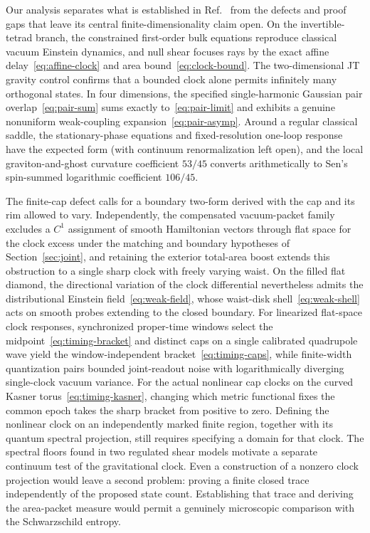 \documentclass[10pt,a4paper]{article}
\numberwithin{equation}{section}
\begin{document}
Our analysis separates what is established in Ref.~\cite{Chandrasekaran2026} from the defects and proof gaps that leave its central finite-dimensionality claim open.
On the invertible-tetrad branch, the constrained first-order bulk equations reproduce classical vacuum Einstein dynamics, and null shear focuses rays by the exact affine delay~\eqref{eq:affine-clock} and area bound~\eqref{eq:clock-bound}.
The two-dimensional JT gravity control confirms that a bounded clock alone permits infinitely many orthogonal states.
In four dimensions, the specified single-harmonic Gaussian pair overlap~\eqref{eq:pair-sum} sums exactly to~\eqref{eq:pair-limit} and exhibits a genuine nonuniform weak-coupling expansion~\eqref{eq:pair-asymp}.
Around a regular classical saddle, the stationary-phase equations and fixed-resolution one-loop response have the expected form (with continuum renormalization left open), and the local graviton-and-ghost curvature coefficient $53/45$ converts arithmetically to Sen's spin-summed logarithmic coefficient $106/45$.

The finite-cap defect calls for a boundary two-form derived with the cap and its rim allowed to vary. Independently, the compensated vacuum-packet family excludes a $C^1$ assignment of smooth Hamiltonian vectors through flat space for the clock excess under the matching and boundary hypotheses of Section~\ref{sec:joint}, and retaining the exterior total-area boost extends this obstruction to a single sharp clock with freely varying waist. On the filled flat diamond, the directional variation of the clock differential nevertheless admits the distributional Einstein field~\eqref{eq:weak-field}, whose waist-disk shell~\eqref{eq:weak-shell} acts on smooth probes extending to the closed boundary. For linearized flat-space clock responses, synchronized proper-time windows select the midpoint~\eqref{eq:timing-bracket} and distinct caps on a single calibrated quadrupole wave yield the window-independent bracket~\eqref{eq:timing-caps}, while finite-width quantization pairs bounded joint-readout noise with logarithmically diverging single-clock vacuum variance. For the actual nonlinear cap clocks on the curved Kasner torus~\eqref{eq:timing-kasner}, changing which metric functional fixes the common epoch takes the sharp bracket from positive to zero. Defining the nonlinear clock on an independently marked finite region, together with its quantum spectral projection, still requires specifying a domain for that clock. The spectral floors found in two regulated shear models motivate a separate continuum test of the gravitational clock. Even a construction of a nonzero clock projection would leave a second problem: proving a finite closed trace independently of the proposed state count. Establishing that trace and deriving the area-packet measure would permit a genuinely microscopic comparison with the Schwarzschild entropy.
\end{document}
